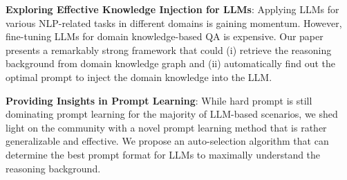 \documentclass{article}
\theoremstyle{boldremark}
\begin{document}
{\bf Exploring Effective Knowledge Injection for LLMs}: Applying LLMs for various NLP-related tasks in different domains is gaining momentum. However, fine-tuning LLMs for domain knowledge-based QA is expensive. Our paper presents a remarkably strong framework that could (i) retrieve the reasoning background from domain knowledge graph and (ii) automatically find out the optimal prompt to inject the domain knowledge into the LLM.

{\bf Providing Insights in Prompt Learning}: While hard prompt is still dominating prompt learning for the majority of LLM-based scenarios, we shed light on the community with a novel prompt learning method that is rather generalizable and effective. We propose an auto-selection algorithm that can determine the best prompt format for LLMs to maximally understand the reasoning background.
\end{document}
